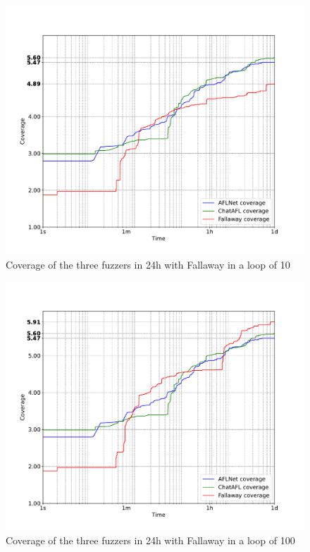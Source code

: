 \begin{figure}[H]
    \centering
    \includegraphics[width=1\textwidth]{Images/coverage_over_time_lighttpd-1day-10l.pdf}
    \caption{Coverage of the three fuzzers in 24h with Fallaway in a loop of 10}
    \label{fig:coverage_10hours}
\end{figure}

\begin{figure}[H]
    \centering
    \includegraphics[width=1\textwidth]{Images/coverage_over_time_lighttpd-1day-100l.pdf}
    \caption{Coverage of the three fuzzers in 24h with Fallaway in a loop of 100}
    \label{fig:coverage_10hours}
\end{figure}

